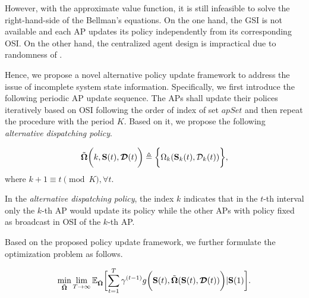 However, with the approximate value function, it is still infeasible to solve the right-hand-side of the Bellman's equations.
On the one hand, the GSI is not available and each AP updates its policy independently from its corresponding OSI.
On the other hand, the centralized agent design is impractical due to randomness of \brlatency.

Hence, we propose a novel alternative policy update framework to address the issue of incomplete system state information.
Specifically, we first introduce the following periodic AP update sequence.
The APs shall update their polices iteratively based on OSI following the order of index of set $apSet$ and then repeat the procedure with the period $K$.
Based on it, we propose the following \emph{alternative dispatching policy}.
\begin{definition}
    \begin{align}
        \tilde{\boldsymbol{\Omega}}\bigg( k, \mathbf{S}(t), \boldsymbol{\mathcal{D}}(t) \bigg) \triangleq \bigg\{
            \Omega_{k}( \mathbf{S}_{k}(t), \mathcal{D}_{k}(t) )
        \bigg\},
    \end{align}
    where $k+1 \equiv t \pmod{K}, \forall t$.
\end{definition}
\begin{remark}
    In the \emph{alternative dispatching policy}, the index $k$ indicates that in the $t$-th interval only the $k$-th AP would update its policy while the other APs with policy fixed as broadcast in OSI of the $k$-th AP.
\end{remark}

Based on the proposed policy update framework, we further formulate the optimization problem as follows.
\begin{problem}
    \begin{align}
        \min_{\tilde{\Policy}} \lim_{T\to\infty} \mathbb{E}_{\tilde{\Policy}} \Bracket{
            \sum_{t=1}^{T} \gamma^{(t-1)} g\Paren{
                \Stat(t), \tilde{\Policy}(\Stat(t), \Delay(t))
            } | \Stat(1)
        }.
    \end{align}
    \label{problem_2}
\end{problem}

